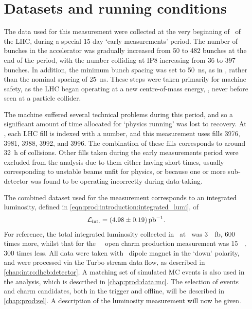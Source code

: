 \chapter{Datasets and running conditions}
\label{chap:prod:data}

The data used for this measurement were collected at the very beginning of 
\runtwo\ of the \ac{LHC}, during a special 15-day `early measurements' period.
The number of bunches in the accelerator was gradually increased from 50 to 482 
bunches at the end of the period, with the number colliding at IP8 increasing 
from 36 to 397 bunches.
In addition, the minimum bunch spacing was set to \SI{50}{\nano\second}, as in 
\runone, rather than the nominal \runtwo spacing of \SI{25}{\nano\second}.
These steps were taken primarily for machine safety, as the \ac{LHC} began 
operating at a new centre-of-mass energy, , never before seen at a 
particle collider.

The machine suffered several technical problems during this period, and so a 
significant amount of time allocated for `physics running' was lost to 
recovery.
At \lhcb, each \ac{LHC} fill is indexed with a number, and this measurement 
uses fills 3976, 3981, 3988, 3992, and 3996.
The combination of these fills corresponds to around \SI{32}{\hour} of 
collisions.
Other fills taken during the early measurements period were excluded from the 
analysis due to them either having short times, usually corresponding to 
unstable beams unfit for physics, or because one or more sub-detector was found 
to be operating incorrectly during data-taking.

The combined dataset used for the measurement corresponds to an integrated 
luminosity, defined in \cref{eqn:prod:introduction:integrated_lumi}, of
\begin{equation}
  \intlumi = \SI{\xsectotlumi}{\per\pico\barn}.
  \label{eqn:prod:xsectotlumi}
\end{equation}
For reference, the total integrated luminosity collected in \runone\ at \lhcb\ 
was \SI{3}{\per\femto\barn}, 600 times more, whilst that for the \ 
\lhcb\ open charm production measurement was \SI{15}{\per\nb}, 300 times less.
All data were taken with \lhcb\ dipole magnet in the `down' polarity, and were 
processed via the Turbo stream data flow, as described in 
\cref{chap:intro:lhcb:detector}.
A matching set of simulated \ac{MC} events is also used in the analysis, which 
is described in \cref{chap:prod:data:mc}.
The selection of events and charm candidates, both in the trigger and offline, 
will be described in \cref{chap:prod:sel}.
A description of the luminosity measurement will now be given.


